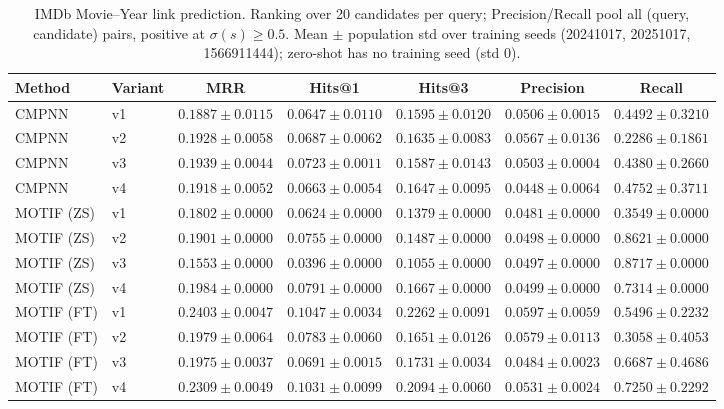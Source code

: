 \begin{table}[t]
\centering
\small
\begin{tabular}{||l||l||c|c|c||c|c||}
\hline
\textbf{Method} & \textbf{Variant} & \textbf{MRR} & \textbf{Hits@1} & \textbf{Hits@3} & \textbf{Precision} & \textbf{Recall} \\
\hline\hline
CMPNN & v1 & $0.1887 \pm 0.0115$ & $0.0647 \pm 0.0110$ & $0.1595 \pm 0.0120$ & $0.0506 \pm 0.0015$ & $0.4492 \pm 0.3210$ \\
\hline
CMPNN & v2 & $0.1928 \pm 0.0058$ & $0.0687 \pm 0.0062$ & $0.1635 \pm 0.0083$ & $0.0567 \pm 0.0136$ & $0.2286 \pm 0.1861$ \\
\hline
CMPNN & v3 & $0.1939 \pm 0.0044$ & $0.0723 \pm 0.0011$ & $0.1587 \pm 0.0143$ & $0.0503 \pm 0.0004$ & $0.4380 \pm 0.2660$ \\
\hline
CMPNN & v4 & $0.1918 \pm 0.0052$ & $0.0663 \pm 0.0054$ & $0.1647 \pm 0.0095$ & $0.0448 \pm 0.0064$ & $0.4752 \pm 0.3711$ \\
\hline
\hline
MOTIF (ZS) & v1 & $0.1802 \pm 0.0000$ & $0.0624 \pm 0.0000$ & $0.1379 \pm 0.0000$ & $0.0481 \pm 0.0000$ & $0.3549 \pm 0.0000$ \\
\hline
MOTIF (ZS) & v2 & $0.1901 \pm 0.0000$ & $0.0755 \pm 0.0000$ & $0.1487 \pm 0.0000$ & $0.0498 \pm 0.0000$ & $0.8621 \pm 0.0000$ \\
\hline
MOTIF (ZS) & v3 & $0.1553 \pm 0.0000$ & $0.0396 \pm 0.0000$ & $0.1055 \pm 0.0000$ & $0.0497 \pm 0.0000$ & $0.8717 \pm 0.0000$ \\
\hline
MOTIF (ZS) & v4 & $0.1984 \pm 0.0000$ & $0.0791 \pm 0.0000$ & $0.1667 \pm 0.0000$ & $0.0499 \pm 0.0000$ & $0.7314 \pm 0.0000$ \\
\hline
\hline
MOTIF (FT) & v1 & $0.2403 \pm 0.0047$ & $0.1047 \pm 0.0034$ & $0.2262 \pm 0.0091$ & $0.0597 \pm 0.0059$ & $0.5496 \pm 0.2232$ \\
\hline
MOTIF (FT) & v2 & $0.1979 \pm 0.0064$ & $0.0783 \pm 0.0060$ & $0.1651 \pm 0.0126$ & $0.0579 \pm 0.0113$ & $0.3058 \pm 0.4053$ \\
\hline
MOTIF (FT) & v3 & $0.1975 \pm 0.0037$ & $0.0691 \pm 0.0015$ & $0.1731 \pm 0.0034$ & $0.0484 \pm 0.0023$ & $0.6687 \pm 0.4686$ \\
\hline
MOTIF (FT) & v4 & $0.2309 \pm 0.0049$ & $0.1031 \pm 0.0099$ & $0.2094 \pm 0.0060$ & $0.0531 \pm 0.0024$ & $0.7250 \pm 0.2292$ \\
\hline
\end{tabular}
\caption{IMDb Movie--Year link prediction. Ranking over 20 candidates per query; Precision/Recall pool all (query, candidate) pairs, positive at $\sigma(s) \geq 0.5$. Mean $\pm$ population std over training seeds (20241017, 20251017, 1566911444); zero-shot has no training seed (std 0). }
\label{tab:imdb_movie_year_seed_performance}
\end{table}
